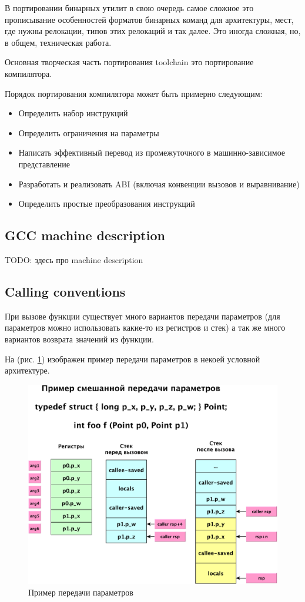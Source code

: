 \documentclass[a4paper,12pt,oneside]{article}
\begin{document}
В портировании бинарных утилит в свою очередь самое сложное это прописывание особенностей форматов бинарных команд для архитектуры, мест, где нужны релокации, типов этих релокаций и так далее. Это иногда сложная, но, в общем, техническая работа.

Основная творческая часть портирования toolchain это портирование компилятора.

Порядок портирования компилятора может быть примерно следующим:

\begin{itemize}
\item Определить набор инструкций
\item Определить ограничения на параметры
\item Написать эффективный перевод из промежуточного в машинно-зависимое представление
\item Разработать и реализовать ABI (включая конвенции вызовов и выравнивание)
\item Определить простые преобразования инструкций
\end{itemize}

\subsection{GCC machine description}

TODO: здесь про machine description

\subsection{Calling conventions}

При вызове функции существует много вариантов передачи параметров (для параметров можно использовать какие-то из регистров и стек) а так же много вариантов возврата значений из функции. 

На (рис. \ref{fig:abi}) изображен пример передачи параметров в некоей условной архитектуре.

\begin{figure}[ht]
\centering
\includegraphics[width=1.0\textwidth]{illustrations/abi-sample-2-crop.pdf}
\caption{Пример передачи параметров}
\label{fig:abi}
\end{figure}
\end{document}
